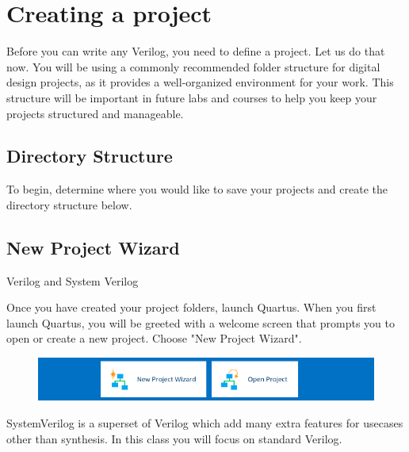 \documentclass[12pt]{labmanual}
\begin{document}
\section{Creating a project}
Before you can write any Verilog, you need to define a project. Let us do that now. You will be using a commonly recommended folder structure for digital design projects, as it provides a well-organized environment for your work. This structure will be important in future labs and courses to help you keep your projects structured and manageable. 

\subsection{Directory Structure}
\label{sec:dir-struct}
To begin, determine where you would like to save your projects and create the directory structure below.
\\

\subsection{New Project Wizard}
\begin{aside}[0.6,0.4]{Verilog and System Verilog}
\begin{leftcontent}
Once you have created your project folders, launch Quartus. When you first launch Quartus, you will be greeted with a welcome screen that prompts you to open or create a new project. Choose "New Project Wizard".
\begin{figure}[H]
    \centering
    \includegraphics[width=\columnwidth]{newproject.png}
\end{figure}
\end{leftcontent}
\begin{rightcontent}
SystemVerilog is a superset of Verilog which add many extra features for usecases other than synthesis. In this class you will focus on standard Verilog.
\end{rightcontent}
\end{aside}
\end{document}
